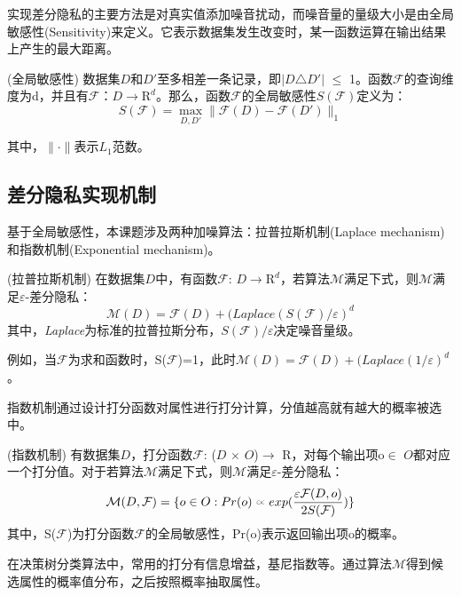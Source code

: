 实现差分隐私的主要方法是对真实值添加噪音扰动，而噪音量的量级大小是由全局敏感性(Sensitivity)来定义。它表示数据集发生改变时，某一函数运算在输出结果上产生的最大距离。

\begin{defn}
	(\textsc{全局敏感性})\supercite{Dwork-Calibrating} 数据集$D$和$D'$至多相差一条记录，即$|D$$\triangle$$D'|$ $\leqslant$ 1。函数$\mathcal{F}$的查询维度为d，并且有$\mathcal{F}$：$D \rightarrow \mathrm{R}^d$。那么，函数$\mathcal{F}$的全局敏感性$S(\mathcal{F})$定义为：
\begin{equation}
\label{eq:res2}
	S(\mathcal{F}) = \max \limits_{D,D'} \| \mathcal{F}(D) - \mathcal{F}(D') \|_{1}
\end{equation}

其中，$\|\cdot\|$表示$L_{1}$范数。
\end{defn}

\subsection{差分隐私实现机制}

基于全局敏感性，本课题涉及两种加噪算法：拉普拉斯机制(Laplace mechanism)和指数机制(Exponential mechanism)。

\begin{thm}
	\label{thm:res1}
	(\textsc{拉普拉斯机制})\supercite{Dwork-Calibrating} 在数据集$D$中，有函数$\mathcal{F}$: $D\rightarrow \mathrm{R}^d$，若算法$\mathcal{M}$满足下式，则$\mathcal{M}$满足$\varepsilon$-差分隐私：
	\begin{equation}
	\mathcal{M}(D) = \mathcal{F}(D) + (\textit{Laplace}(S(\mathcal{F})/ \varepsilon)^d
	\end{equation}
	其中，\textit{Laplace}为标准的拉普拉斯分布，$S(\mathcal{F})/\varepsilon$决定噪音量级。
\end{thm}
例如，当$\mathcal{F}$为求和函数时，S($\mathcal{F}$)=1，此时$\mathcal{M}(D) = \mathcal{F}(D) + (\textit{Laplace}(1/\varepsilon)^d$。

指数机制通过设计打分函数对属性进行打分计算，分值越高就有越大的概率被选中。
\begin{thm}
	\label{thm:res2}
	(\textsc{指数机制})\supercite{exponential} 有数据集$D$，打分函数$\mathcal{F}$: ($D$ $\times$ $O$)$\rightarrow$ $\mathrm{R}$，对每个输出项o$\in$ $O$都对应一个打分值。对于若算法$\mathcal{M}$满足下式，则$\mathcal{M}$满足$\varepsilon$-差分隐私：
	\begin{equation}
	\mathcal{M}(D,\mathcal{F}) = \{o \in O: Pr(o)\wasypropto exp(\frac{\varepsilon\mathcal{F}(D,o)}{2S(\mathcal{F})}) \}
	\end{equation}
	其中，S($\mathcal{F}$)为打分函数$\mathcal{F}$的全局敏感性，Pr(o)表示返回输出项o的概率。
\end{thm}
在决策树分类算法中，常用的打分有信息增益，基尼指数等。通过算法$\mathcal{M}$得到候选属性的概率值分布，之后按照概率抽取属性。

